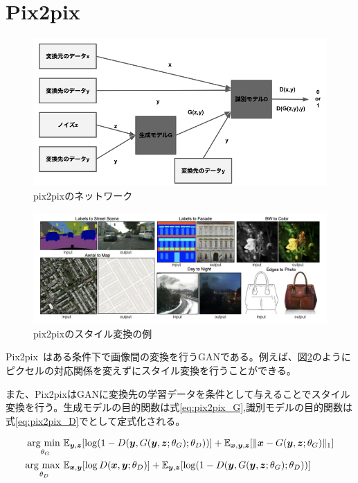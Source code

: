 \section{Pix2pix}

\begin{figure}[t]
\begin{center}
\includegraphics[width=\hsize]{figure/pix2pix_net.png}
\caption{pix2pixのネットワーク}
\label{fig:pix2pix_net}
\end{center}
\end{figure}

\begin{figure}[t]
\begin{center}
\includegraphics[width=\hsize]{figure/pix2pix_img.png}
\caption{pix2pixのスタイル変換の例}
\label{fig:pix2pix_img}
\end{center}
\end{figure}

Pix2pix~\cite{pix2pix}はある条件下で画像間の変換を行うGANである。例えば、図\ref{fig:pix2pix_img}のようにピクセルの対応関係を変えずにスタイル変換を行うことができる。

また、Pix2pixはGANに変換先の学習データを条件として与えることでスタイル変換を行う。生成モデルの目的関数は式\ref{eq:pix2pix_G},識別モデルの目的関数は式\ref{eq:pix2pix_D}でとして定式化される。

\begin{align}
    \label{eq:pix2pix_G}
    \mathop{\rm arg~min~}\limits _{\theta_G}& \mathbb{E}_{\boldsymbol{y}, \boldsymbol{z}}[\log (1-D(\boldsymbol{y}, G(\boldsymbol{y}, \boldsymbol{z}; \theta_G); \theta_D))]+\mathbb{E}_{\boldsymbol{x}, \boldsymbol{y}, \boldsymbol{z}}[\|\boldsymbol{x}-G(\boldsymbol{y}, \boldsymbol{z}; \theta_G)\|_{1}]\\
    \label{eq:pix2pix_D}
    \mathop{\rm arg~max~}\limits _{\theta_D}& \mathbb{E}_{\boldsymbol{x}, \boldsymbol{y}}[\log D(\boldsymbol{x}, \boldsymbol{y}; \theta_D)]+\mathbb{E}_{\boldsymbol{y}, \boldsymbol{z}}[\log (1-D(\boldsymbol{y}, G(\boldsymbol{y}, \boldsymbol{z}; \theta_G); \theta_D))]
\end{align}


